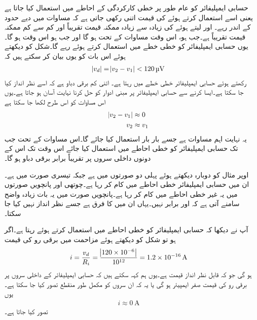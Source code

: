 حسابی ایمپلیفائر کو عام طور  پر خطی کارکردگی کے احاطے میں استعمال کیا جاتا ہے یعنی اسے  استعمال کرتے ہوئے   کی قیمت اتنی رکھی جاتی ہے کہ  مساوات  میں دیے حدود کے اندر رہے۔ اور  لیتے ہوئے  کی زیادہ سے زیادہ ممکنہ قیمت تقریباً اور کم سے کم ممکنہ قیمت تقریباً  ہے۔جب ہو،  اس وقت مساوات   کے تحت  ہو گا اور جب   ہو اس وقت ہو گا۔یوں حسابی ایمپلیفائر کو خطی خطے میں استعمال کرتے ہوئے  رہے گا۔شکل   کو دیکھتے ہوئے اس بات کو یوں بیان کر سکتے ہیں کہ
\begin{align}
\abs{v_d} =\abs{v_2-v_1} < \SI{120}{\micro \volt}
\end{align}
رکھتے ہوئے حسابی ایمپلیفائر خطی خطے میں رہتا ہے۔ اتنی کم برقی دباو ہے کہ اسے نظر انداز کیا جا سکتا ہے۔ایسا کرنے سے حسابی ایمپلیفائر پر مبنی ادوار کو حل کرنا نہایت آسان ہو جاتا ہے۔یوں  اس مساوات کو اس طرح لکھا جا سکتا ہے
\begin{gather}
\begin{aligned} \label{مساوات_حسابی_داخلی_سروں_پر_برابر_دباو}
\abs{v_2  -  v_1} &\approx 0   \\
v_2 & \approx v_1
\end{aligned}
\end{gather}
	یہ نہایت اہم مساوات ہے  جسے  بار بار استعمال کیا جائے گا۔اس مساوات کے تحت جب تک حسابی ایمپلیفائر کو خطی احاطے میں استعمال کیا جائے اس وقت تک اس کے دونوں داخلی سروں پر تقریباً برابر برقی دباو ہو گا۔

	اوپر مثال کو دوبارہ دیکھتے ہوئے پہلی دو صورتوں میں ہے جبکہ تیسری صورت میں  ہے۔ان میں حسابی ایمپلیفائر خطی احاطے میں کام کر رہا ہے۔چوتھی اور پانچویں صورتوں میں یہ غیر خطی احاطے میں کام کر رہا ہے۔پانچویں صورت میں یہ بات زیادہ واضح سامنے آتی ہے کہ  اور برابر نہیں۔یہاں ان میں   کا فرق ہے جسے نظر انداز نہیں کیا جا سکتا۔

	آپ نے دیکھا کہ حسابی ایمپلیفائر کو خطی احاطے میں استعمال کرتے ہوئے   رہتا ہے۔اگر ہو تو شکل   کو دیکھتے ہوئے مزاحمت میں برقی رو  کی قیمت
\begin{align}
i=\frac{v_d}{R_i} =\frac{\abs{120 \times 10^{-6}}}{10^{12}}=\SI{1.2e-16}{\ampere}
\end{align}
ہو گی جو کہ قابل نظر انداز قیمت ہے۔یوں ہم کہہ سکتے ہیں کہ حسابی ایمپلیفائر کے داخلی سروں پر برقی رو کی قیمت صفر ایمپیئر ہو گی یا یہ کہ ان سروں کو مکمل طور منقطع تصور کیا جا سکتا ہے۔یوں
\begin{align} \label{مساوات_حسابی_صفر_داخلی_رو}
{i \approx \SI{0}{\ampere}}
\end{align}
تصور کیا جاتا ہے۔

